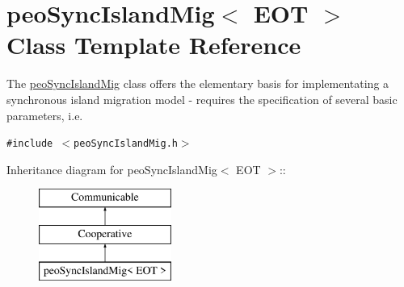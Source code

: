 \hypertarget{classpeoSyncIslandMig}{
\section{peo\-Sync\-Island\-Mig$<$ EOT $>$ Class Template Reference}
\label{classpeoSyncIslandMig}
}
The \hyperlink{classpeoSyncIslandMig}{peo\-Sync\-Island\-Mig} class offers the elementary basis for implementating a synchronous island migration model - requires the specification of several basic parameters, i.e.  


{\tt \#include $<$peo\-Sync\-Island\-Mig.h$>$}

Inheritance diagram for peo\-Sync\-Island\-Mig$<$ EOT $>$::\begin{figure}[H]
\begin{center}
\leavevmode
\includegraphics[height=3cm]{classpeoSyncIslandMig}
\end{center}
\end{figure}

